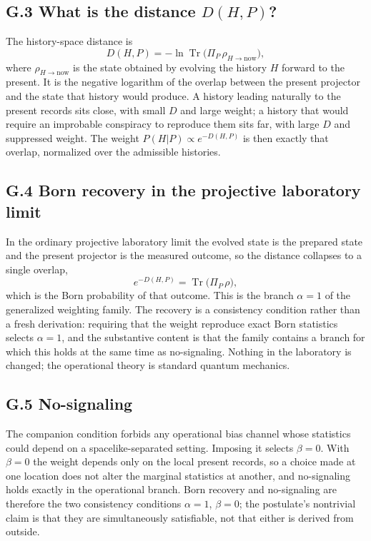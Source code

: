 \documentclass[11pt]{article}
\begin{document}
\subsection*{G.3 What is the distance $D(H,P)$?}

The history-space distance is
\[
D(H,P)=-\ln\operatorname{Tr}\!\bigl(\Pi_P\,\rho_{H\to\mathrm{now}}\bigr),
\]
where $\rho_{H\to\mathrm{now}}$ is the state obtained by evolving the history $H$ forward to the present. It is the negative logarithm of the overlap between the present projector and the state that history would produce. A history leading naturally to the present records sits close, with small $D$ and large weight; a history that would require an improbable conspiracy to reproduce them sits far, with large $D$ and suppressed weight. The weight $P(H|P)\propto e^{-D(H,P)}$ is then exactly that overlap, normalized over the admissible histories.

\subsection*{G.4 Born recovery in the projective laboratory limit}

In the ordinary projective laboratory limit the evolved state is the prepared state and the present projector is the measured outcome, so the distance collapses to a single overlap,
\[
e^{-D(H,P)}=\operatorname{Tr}\!\bigl(\Pi_P\,\rho\bigr),
\]
which is the Born probability of that outcome. This is the branch $\alpha=1$ of the generalized weighting family. The recovery is a consistency condition rather than a fresh derivation: requiring that the weight reproduce exact Born statistics selects $\alpha=1$, and the substantive content is that the family contains a branch for which this holds at the same time as no-signaling. Nothing in the laboratory is changed; the operational theory is standard quantum mechanics.

\subsection*{G.5 No-signaling}

The companion condition forbids any operational bias channel whose statistics could depend on a spacelike-separated setting. Imposing it selects $\beta=0$. With $\beta=0$ the weight depends only on the local present records, so a choice made at one location does not alter the marginal statistics at another, and no-signaling holds exactly in the operational branch. Born recovery and no-signaling are therefore the two consistency conditions $\alpha=1$, $\beta=0$; the postulate's nontrivial claim is that they are simultaneously satisfiable, not that either is derived from outside.
\end{document}
